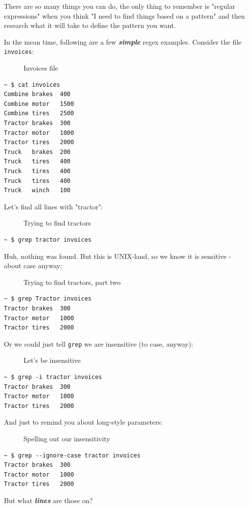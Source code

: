 \documentclass[10pt,]{book}
\numberwithin{figure}{chapter}
\DeclareRobustCommand{\drcap}[1]{\begin{figure}[H]\caption{#1}\end{figure}}
\begin{document}
There are so many things you can do, the only thing to remember is
"regular expressions" when you think "I need to find things based on a
pattern" and then research what it will take to define the pattern you
want.

In the mean time, following are a few \textbf{\emph{simple}} regex
examples. Consider the file \texttt{invoices}:

\drcap{Invoices file}

\begin{verbatim}
~ $ cat invoices
Combine brakes  400
Combine motor   1500
Combine tires   2500
Tractor brakes  300
Tractor motor   1000
Tractor tires   2000
Truck   brakes  200
Truck   tires   400
Truck   tires   400
Truck   tires   400
Truck   winch   100
\end{verbatim}

Let's find all lines with "tractor":

\drcap{Trying to find tractors}

\begin{verbatim}
~ $ grep tractor invoices
\end{verbatim}

Huh, nothing was found. But this is UNIX-land, so we know it is
sensitive - about case anyway:

\drcap{Trying to find tractors, part two}

\begin{verbatim}
~ $ grep Tractor invoices
Tractor brakes  300
Tractor motor   1000
Tractor tires   2000
\end{verbatim}

Or we could just tell \texttt{grep} we are insensitive (to case,
anyway):

\drcap{Let's be insensitive}

\begin{verbatim}
~ $ grep -i tractor invoices
Tractor brakes  300
Tractor motor   1000
Tractor tires   2000
\end{verbatim}

And just to remind you about long-style parameters:

\drcap{Spelling out our insensitivity}

\begin{verbatim}
~ $ grep --ignore-case tractor invoices
Tractor brakes  300
Tractor motor   1000
Tractor tires   2000
\end{verbatim}

But what \textbf{\emph{lines}} are those on?
\end{document}
